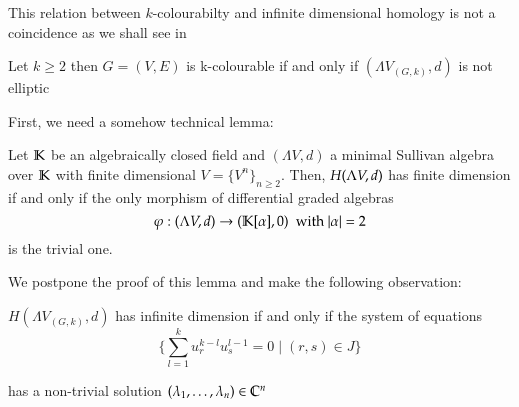 This relation between $k$-colourabilty and infinite dimensional homology is not a coincidence as we shall see in

 \begin{Theorem}
\label{thm:KColourEquivalentToNonEllipticity}
  Let $k \geq 2$ then 
   $G = (V,E)$ is k-colourable if and only if $(\Lambda V_{(G,k)},d)$ is not elliptic
 \end{Theorem}
 
 First, we need a somehow technical lemma:
 \begin{Lemma}
\label{lma:IfAndOnlyIfNonTrivialMorphism}
  Let $\mathbb{K}$ be an algebraically closed field and $(\Lambda V,d)$ a minimal Sullivan
  algebra over $\mathbb{K}$ with finite dimensional $V = {\lbrace V^n \rbrace}_{n \geq 2}$. Then,
  $H(\Lambda V,d)$ has finite dimension if and only if   
  the only morphism of differential graded algebras 
  $$ \varphi : (\Lambda V,d) \to (\mathbb{K}[\alpha],0) \; \text{ with $|\alpha| = 2$} $$ 
  is the trivial one.
 \end{Lemma}
  
  We postpone the proof of this lemma and make the following observation:
  
 
\begin{Lemma}
\label{lma:cohomoly+equations}
 $H(\Lambda V_{(G,k)}, d)$ has infinite dimension if and only if the system of equations 
 \begin{equation}
 \label{systemofequations}
 {\lbrace \sum_{l = 1}^k u_r^{k - l} u_s^{l - 1} = 0 \; | \; (r,s) \in J \rbrace}  
 \end{equation}
 
 has a non-trivial solution 
 $(\lambda_1 , \dotsc, \lambda_n) \in \mathbb{C}^n$
\end{Lemma}

